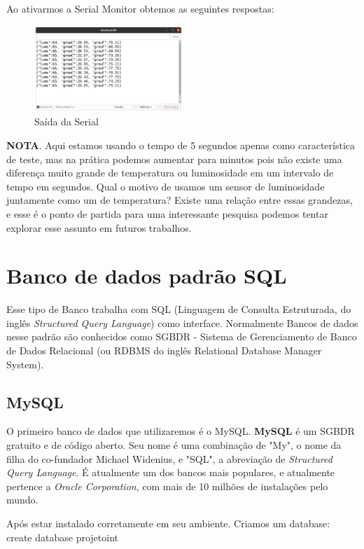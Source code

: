 \documentclass[a4paper,11pt]{article}
\begin{document}
Ao ativarmos a Serial Monitor obtemos as seguintes respostas:
\begin{figure}[H]
	\centering
	\includegraphics[width=0.50\textwidth]{images/saida}
	\caption{Saída da Serial}
\end{figure}

\textbf{NOTA}. Aqui estamos usando o tempo de 5 segundos apenas como característica de teste, mas na prática podemos aumentar para minutos pois não existe uma diferença muito grande de temperatura ou luminosidade em um intervalo de tempo em segundos. Qual o motivo de usamos um sensor de luminosidade juntamente como um de temperatura? Existe uma relação entre essas grandezas, e esse é o ponto de partida para uma interessante pesquisa podemos tentar explorar esse assunto em futuros trabalhos.

\section*{Banco de dados padrão SQL}
Esse tipo de Banco trabalha com SQL (Linguagem de Consulta Estruturada, do inglês \textit{Structured Query Language}) como interface. Normalmente Bancos de dados nesse padrão são conhecidos como SGBDR - Sistema de Gerenciamento de Banco de Dados Relacional (ou RDBMS do inglês Relational Database Manager System).

\subsection*{MySQL}
O primeiro banco de dados que utilizaremos é o MySQL. \textbf{MySQL} é um SGBDR gratuito e de código aberto. Seu nome é uma combinação de "My", o nome da filha do co-fundador Michael Widenius, e "SQL", a abreviação de \textit{Structured Query Language}. É atualmente um dos bancos mais populares, e atualmente pertence a \textit{Oracle Corporation}, com mais de 10 milhões de instalações pelo mundo. 

Após estar instalado corretamente em seu ambiente. Criamos um database: \\
{\ttfamily create database projetoint}
\end{document}
